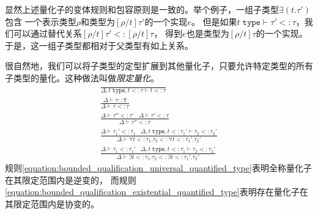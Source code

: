 显然上述量化子的变体规则和包容原则是一致的。举个例子，一组子类型$\exists(t.\tau{'})$包含
一个表示类型$\rho$和类型为$[\rho/t]\tau{'}$的一个实现$e$。
但是如果$t\;\texttt{type}\vdash\tau{'}<:\tau$，我们可以通过替代关系$[\rho/t]\tau{'}<:[\rho/t]\tau$， 
得到$e$也是类型为$[\rho/t]\tau$的一个实现。
于是，这一组子类型都相对于父类型有如上关系。

很自然地，我们可以将子类型的定型扩展到其他量化子，只要允许特定类型的所有子类型的量化。这种做法叫做\textit{限定量化}。
\begin{subequations}
    \begin{gather}
        \frac{}
        {\Delta,t\;\texttt{type},t<:\tau\vdash t<:\tau}
        \\
        \frac{\Delta\vdash\tau:: \texttt{T}}
        {\Delta\vdash\tau<:\tau}
        \\
        \frac{\Delta\vdash\tau{''}<:\tau{'}\;\;\;\Delta\vdash\tau{'}<:\tau}
        {\Delta\vdash\tau{''}<:\tau}
        \\
        \frac{\Delta\vdash\tau_1{'}<:\tau_1\;\;\;\Delta,t\;\texttt{type},t<:\tau_1{'}\vdash\tau_2<:\tau_2{'}}
        {\Delta\vdash\forall t<:\tau_1.\tau_2<:\forall t<:\tau_1{'}.\tau_2{'}}
        \label{equation:bounded_qualification_universal_quantified_type}
        \\
        \frac{\Delta\vdash\tau_1<:\tau_1{'}\;\;\;\Delta,t\;\texttt{type},t<:\tau_1\vdash\tau_2<:\tau_2{'}}
        {\Delta\vdash\exists t<:\tau_1.\tau_2<:\exists t<:\tau_1{'}.\tau_2{'}}
        \label{equation:bounded_qualification_existential_quantified_type}
    \end{gather}
\end{subequations}
规则\ref{equation:bounded_qualification_universal_quantified_type}表明全称量化子在其限定范围内是逆变的，
而规则\ref{equation:bounded_qualification_existential_quantified_type}表明存在量化子在其限定范围内是协变的。
